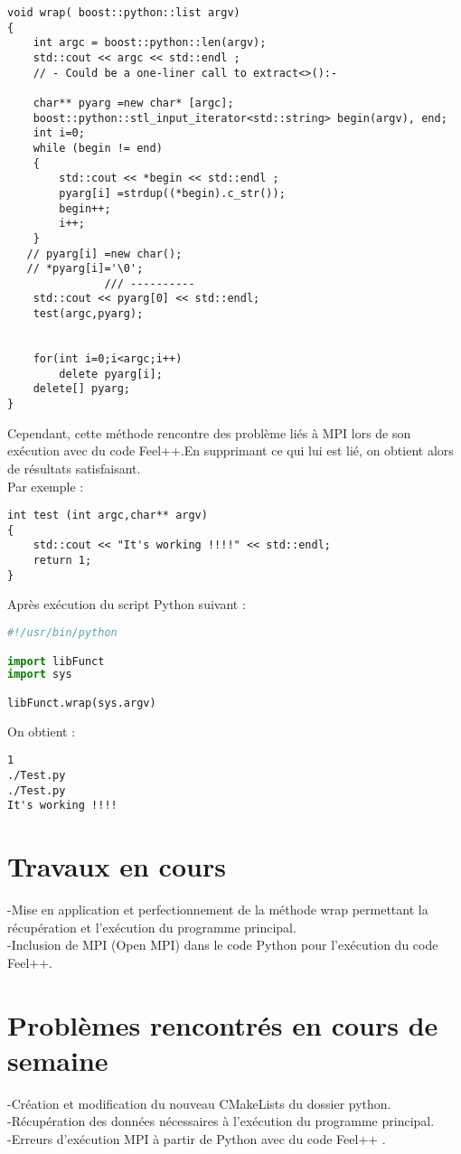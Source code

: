 \documentclass[12pt]{article}
\begin{document}
\begin{lstlisting}
void wrap( boost::python::list argv)
{
    int argc = boost::python::len(argv);
    std::cout << argc << std::endl ;
    // - Could be a one-liner call to extract<>():-
    
    char** pyarg =new char* [argc];
    boost::python::stl_input_iterator<std::string> begin(argv), end;
    int i=0;
    while (begin != end)
    {
        std::cout << *begin << std::endl ;
        pyarg[i] =strdup((*begin).c_str());
        begin++;
        i++;
    }
   // pyarg[i] =new char();
   // *pyarg[i]='\0'; 
               /// ----------
    std::cout << pyarg[0] << std::endl;
    test(argc,pyarg);

    
    for(int i=0;i<argc;i++)
        delete pyarg[i];
    delete[] pyarg;
}
\end{lstlisting}

Cependant, cette méthode rencontre des problème liés à MPI lors de son exécution avec du code Feel++.En supprimant ce qui lui est lié, on obtient alors de résultats satisfaisant.\\
Par exemple :
\begin{lstlisting}
int test (int argc,char** argv)
{
    std::cout << "It's working !!!!" << std::endl;
    return 1;  
}
\end{lstlisting}

\newpage
Après exécution du script Python suivant :
\begin{lstlisting}[language=Python]
#!/usr/bin/python

import libFunct
import sys

libFunct.wrap(sys.argv)
\end{lstlisting}

On obtient :
\begin{verbatim}
1
./Test.py
./Test.py
It's working !!!!
\end{verbatim}


\section{Travaux en cours}
-Mise en application et perfectionnement de la méthode wrap permettant la récupération et l'exécution du programme principal.\\

-Inclusion de MPI (Open MPI) dans le code Python pour l'exécution du code Feel++.\\

\section{Problèmes rencontrés en cours de semaine}
-Création et modification du nouveau CMakeLists du dossier python.\\

-Récupération des données nécessaires à l'exécution du programme principal.\\

-Erreurs d'exécution MPI à partir de Python avec du code Feel++ .\\
\end{document}
